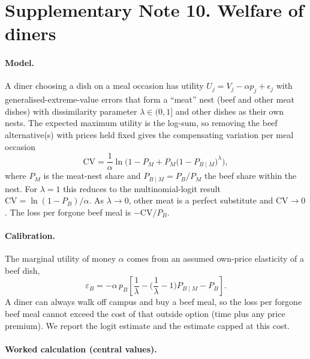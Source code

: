 \documentclass[10pt]{article}
\begin{document}
\section{Supplementary Note 10. Welfare of diners}
\label{si:welfare}

\paragraph{Model.} A diner choosing a dish on a meal occasion has utility
$U_j = V_j - \alpha p_j + \epsilon_j$ with generalised-extreme-value errors that
form a ``meat'' nest (beef and other meat dishes) with dissimilarity parameter
$\lambda\in(0,1]$ and other dishes as their own nests. The expected maximum utility is
the log-sum, so removing the beef alternative(s) with prices held fixed gives
the compensating variation per meal occasion\cite{small1981,train2009}
\begin{equation}
\mathrm{CV} = \frac{1}{\alpha}\ln\!\Big(1 - P_M + P_M\big(1 - P_{B\mid M}\big)^{\lambda}\Big),
\end{equation}
where $P_M$ is the meat-nest share and $P_{B\mid M}=P_B/P_M$ the beef share within
the nest. For $\lambda=1$ this reduces to the multinomial-logit result
$\mathrm{CV}=\ln(1-P_B)/\alpha$. As $\lambda\to 0$, other meat is a perfect
substitute and $\mathrm{CV}\to 0$. The loss per forgone beef meal is $-\mathrm{CV}/P_B$.

\paragraph{Calibration.} The marginal utility of money $\alpha$ comes from an
assumed own-price elasticity of a beef dish,
\begin{equation}
\varepsilon_B = -\alpha\,p_B\left[\frac{1}{\lambda} - \Big(\frac{1}{\lambda}-1\Big)P_{B\mid M} - P_B\right].
\end{equation}
A diner can always walk off campus and buy a beef meal, so the loss per forgone
beef meal cannot exceed the cost of that outside option (time plus any price
premium). We report the logit estimate and the estimate capped at this cost.

\paragraph{Worked calculation (central values).}

\end{document}
